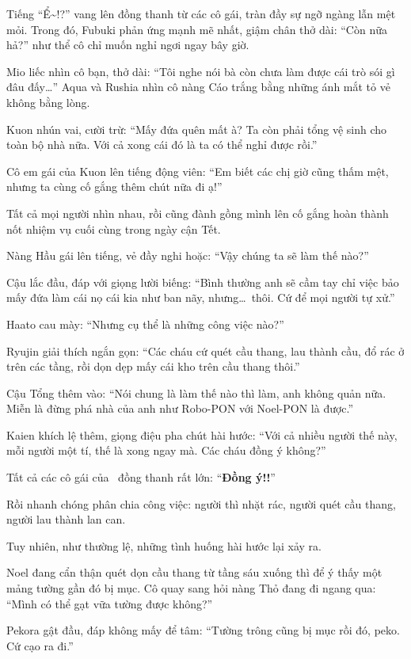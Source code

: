 \documentclass[../main.tex]{subfiles}
\begin{document}
Tiếng ``Ể\~{}!?'' vang lên đồng thanh từ các cô gái, tràn đầy sự ngỡ ngàng lẫn mệt mỏi. Trong đó, Fubuki phản ứng mạnh mẽ nhất, giậm chân thở dài: ``Còn nữa hả?'' như thể cô chỉ muốn nghỉ ngơi ngay bây giờ.

Mio liếc nhìn cô bạn, thở dài: ``Tôi nghe nói bà còn chưa làm được cái trò sói gì đâu đấy\dots'' Aqua và Rushia nhìn cô nàng Cáo trắng bằng những ánh mắt tỏ vẻ không bằng lòng.

Kuon nhún vai, cười trừ: ``Mấy đứa quên mất à? Ta còn phải tổng vệ sinh cho toàn bộ nhà nữa. Với cả xong cái đó là ta có thể nghỉ được rồi.''

Cô em gái của Kuon lên tiếng động viên: ``Em biết các chị giờ cũng thấm mệt, nhưng ta cùng cố gắng thêm chút nữa đi ạ!''

Tất cả mọi người nhìn nhau, rồi cũng đành gồng mình lên cố gắng hoàn thành nốt nhiệm vụ cuối cùng trong ngày cận Tết.

Nàng Hầu gái lên tiếng, vẻ đầy nghi hoặc: ``Vậy chúng ta sẽ làm thế nào?''

Cậu lắc đầu, đáp với giọng lười biếng: ``Bình thường anh sẽ cầm tay chỉ việc bảo mấy đứa làm cái nọ cái kia như ban nãy, nhưng\dots\ thôi. Cứ để mọi người tự xử.''

Haato cau mày: ``Nhưng cụ thể là những công việc nào?''

Ryujin giải thích ngắn gọn: ``Các cháu cứ quét cầu thang, lau thành cầu, đổ rác ở trên các tầng, rồi dọn dẹp mấy cái kho trên cầu thang thôi.''

Cậu Tổng thêm vào: ``Nói chung là làm thế nào thì làm, anh không quản nữa. Miễn là đừng phá nhà của anh như Robo-PON với Noel-PON là được.''

Kaien khích lệ thêm, giọng điệu pha chút hài hước: ``Với cả nhiều người thế này, mỗi người một tí, thế là xong ngay mà. Các cháu đồng ý không?''

Tất cả các cô gái của \hll\ đồng thanh rất lớn: ``\textbf{Đồng ý!!}''

Rồi nhanh chóng phân chia công việc: người thì nhặt rác, người quét cầu thang, người lau thành lan can.

Tuy nhiên, như thường lệ, những tình huống hài hước lại xảy ra.

\ct

Noel đang cẩn thận quét dọn cầu thang từ tầng sáu xuống thì để ý thấy một mảng tường gần đó bị mục. Cô quay sang hỏi nàng Thỏ đang đi ngang qua: ``Mình có thể gạt vữa tường được không?''

Pekora gật đầu, đáp không mấy để tâm: ``Tường trông cũng bị mục rồi đó, peko. Cứ cạo ra đi.''
\end{document}
